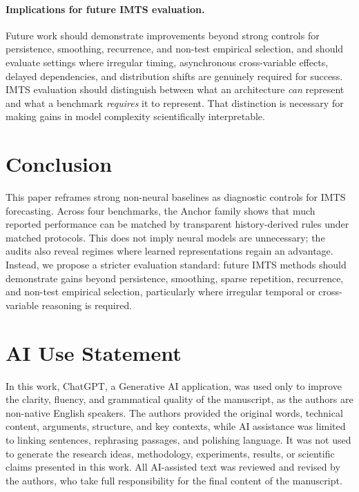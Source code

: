 \documentclass{article}
\begin{document}
\paragraph{Implications for future IMTS evaluation.}
Future work should demonstrate improvements beyond strong controls for persistence, smoothing, recurrence, and non-test empirical selection, and should evaluate settings where irregular timing, asynchronous cross-variable effects, delayed dependencies, and distribution shifts are genuinely required for success. IMTS evaluation should distinguish between what an architecture \emph{can} represent and what a benchmark \emph{requires} it to represent. That distinction is necessary for making gains in model complexity scientifically interpretable.



\section{Conclusion}

This paper reframes strong non-neural baselines as diagnostic controls for IMTS forecasting. Across four benchmarks, the Anchor family shows that much reported performance can be matched by transparent history-derived rules under matched protocols. This does not imply neural models are unnecessary; the audits also reveal regimes where learned representations regain an advantage. Instead, we propose a stricter evaluation standard: future IMTS methods should demonstrate gains beyond persistence, smoothing, sparse repetition, recurrence, and non-test empirical selection, particularly where irregular temporal or cross-variable reasoning is required. 




\newpage

\section*{AI Use Statement}
In this work, ChatGPT, a Generative AI application, was used only to improve the clarity, fluency, and grammatical quality of the manuscript, as the authors are non-native English speakers. The authors provided the original words, technical content, arguments, structure, and key contexts, while AI assistance was limited to linking sentences, rephrasing passages, and polishing language. It  was not used to generate the research ideas, methodology, experiments, results, or scientific claims presented in this work. All AI-assisted text was reviewed and revised by the authors, who take full responsibility for the final content of the manuscript.
\end{document}
